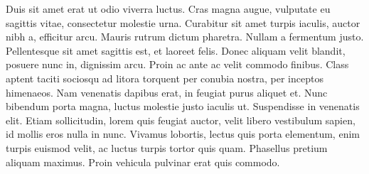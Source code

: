 Duis sit amet erat ut odio viverra luctus. Cras magna augue, vulputate eu sagittis vitae, consectetur molestie urna. Curabitur sit amet turpis iaculis, auctor nibh a, efficitur arcu. Mauris rutrum dictum pharetra. Nullam a fermentum justo. Pellentesque sit amet sagittis est, et laoreet felis. Donec aliquam velit blandit, posuere nunc in, dignissim arcu. Proin ac ante ac velit commodo finibus. Class aptent taciti sociosqu ad litora torquent per conubia nostra, per inceptos himenaeos. Nam venenatis dapibus erat, in feugiat purus aliquet et. Nunc bibendum porta magna, luctus molestie justo iaculis ut. Suspendisse in venenatis elit. Etiam sollicitudin, lorem quis feugiat auctor, velit libero vestibulum sapien, id mollis eros nulla in nunc. Vivamus lobortis, lectus quis porta elementum, enim turpis euismod velit, ac luctus turpis tortor quis quam. Phasellus pretium aliquam maximus. Proin vehicula pulvinar erat quis commodo.
